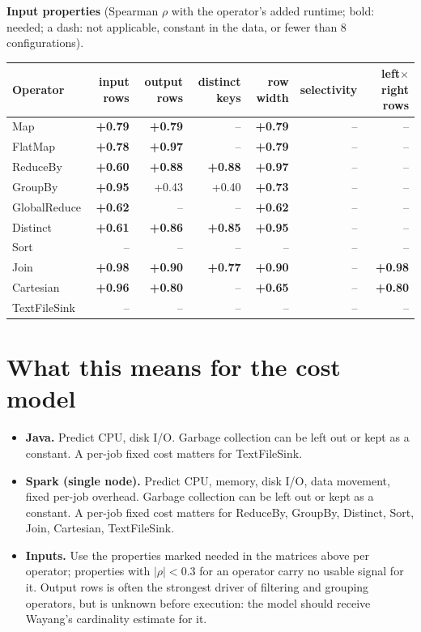 \documentclass[11pt,a4paper]{article}
\newcommand{\hl}[1]{\textbf{#1}}
\begin{document}
\textbf{Input properties} (Spearman $\rho$ with the operator's added runtime; bold: needed; a dash: not applicable, constant in the data, or fewer than 8 configurations).
\begin{center}\footnotesize\begin{tabular}{lrrrrrr}\toprule

Operator & input rows & output rows & distinct keys & row width & selectivity & left$\times$right rows\\\midrule

Map & \hl{+0.79} & \hl{+0.79} & -- & \hl{+0.79} & -- & --\\

FlatMap & \hl{+0.78} & \hl{+0.97} & -- & \hl{+0.79} & -- & --\\

ReduceBy & \hl{+0.60} & \hl{+0.88} & \hl{+0.88} & \hl{+0.97} & -- & --\\

GroupBy & \hl{+0.95} & +0.43 & +0.40 & \hl{+0.73} & -- & --\\

GlobalReduce & \hl{+0.62} & -- & -- & \hl{+0.62} & -- & --\\

Distinct & \hl{+0.61} & \hl{+0.86} & \hl{+0.85} & \hl{+0.95} & -- & --\\

Sort & -- & -- & -- & -- & -- & --\\

Join & \hl{+0.98} & \hl{+0.90} & \hl{+0.77} & \hl{+0.90} & -- & \hl{+0.98}\\

Cartesian & \hl{+0.96} & \hl{+0.80} & -- & \hl{+0.65} & -- & \hl{+0.80}\\

TextFileSink & -- & -- & -- & -- & -- & --\\
\bottomrule\end{tabular}\end{center}
\section{What this means for the cost model}
\begin{itemize}\itemsep2pt
\item \textbf{Java.} Predict CPU, disk I/O. Garbage collection can be left out or kept as a constant. A per-job fixed cost matters for TextFileSink.
\item \textbf{Spark (single node).} Predict CPU, memory, disk I/O, data movement, fixed per-job overhead. Garbage collection can be left out or kept as a constant. A per-job fixed cost matters for ReduceBy, GroupBy, Distinct, Sort, Join, Cartesian, TextFileSink.
\item \textbf{Inputs.} Use the properties marked needed in the matrices above per operator; properties with $|\rho|<0.3$ for an operator carry no usable signal for it. Output rows is often the strongest driver of filtering and grouping operators, but is unknown before execution: the model should receive Wayang's cardinality estimate for it.
\end{itemize}
\end{document}
